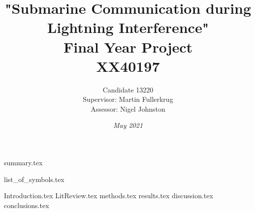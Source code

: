 \documentclass[11pt, oneside, a4paper]{report}
\begin{document}
\begin{titlepage}
    \title{"Submarine Communication during Lightning Interference"\\ Final Year Project \\ XX40197}
    \author{Candidate 13220
    \\[0.5cm]
    Supervisor: Martin Fullerkrug
    \\[0.5cm] 
    Assessor: Nigel Johnston}
    \date{\textit{May 2021}}
\end{titlepage}



\maketitle

{summary.tex}

\pagestyle{empty}
\tableofcontents

\newpage
{}
\renewcommand{\thesection}{\Roman{section}}
\listoffigures
\pagestyle{fancy}
\pagebreak
{}
\listoftables
\pagebreak

{list_of_symbols.tex}
\newpage
\setcounter{section}{0}

\setcounter{page}{1}
\renewcommand{\thesection}{\arabic{chapter}.\arabic{section}}
{Introduction.tex}
\pagebreak
{LitReview.tex}
\pagebreak
{methods.tex}
\pagebreak
{results.tex}
\pagebreak
{discussion.tex}
\pagebreak
{conclusions.tex}
\renewcommand{\bibname}{References}

\end{document}

